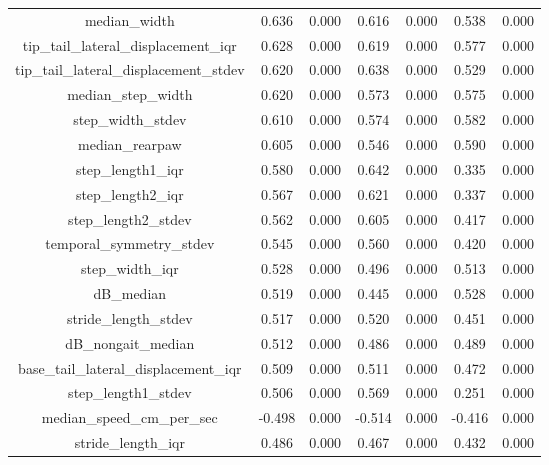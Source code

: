 \documentclass[11pt,reqno]{amsart}
\begin{document}
\begin{longtable}[c]{|c|c|c|c|c|c|c|}
median\_width                             & 0.636    & 0.000   & 0.616  & 0.000   & 0.538   & 0.000   \\
tip\_tail\_lateral\_displacement\_iqr     & 0.628    & 0.000   & 0.619  & 0.000   & 0.577   & 0.000   \\
tip\_tail\_lateral\_displacement\_stdev   & 0.620    & 0.000   & 0.638  & 0.000   & 0.529   & 0.000   \\
median\_step\_width                       & 0.620    & 0.000   & 0.573  & 0.000   & 0.575   & 0.000   \\
step\_width\_stdev                        & 0.610    & 0.000   & 0.574  & 0.000   & 0.582   & 0.000   \\
median\_rearpaw                           & 0.605    & 0.000   & 0.546  & 0.000   & 0.590   & 0.000   \\
step\_length1\_iqr                        & 0.580    & 0.000   & 0.642  & 0.000   & 0.335   & 0.000   \\
step\_length2\_iqr                        & 0.567    & 0.000   & 0.621  & 0.000   & 0.337   & 0.000   \\
step\_length2\_stdev                      & 0.562    & 0.000   & 0.605  & 0.000   & 0.417   & 0.000   \\
temporal\_symmetry\_stdev                 & 0.545    & 0.000   & 0.560  & 0.000   & 0.420   & 0.000   \\
step\_width\_iqr                          & 0.528    & 0.000   & 0.496  & 0.000   & 0.513   & 0.000   \\
dB\_median                                & 0.519    & 0.000   & 0.445  & 0.000   & 0.528   & 0.000   \\
stride\_length\_stdev                     & 0.517    & 0.000   & 0.520  & 0.000   & 0.451   & 0.000   \\
dB\_nongait\_median                       & 0.512    & 0.000   & 0.486  & 0.000   & 0.489   & 0.000   \\
base\_tail\_lateral\_displacement\_iqr    & 0.509    & 0.000   & 0.511  & 0.000   & 0.472   & 0.000   \\
step\_length1\_stdev                      & 0.506    & 0.000   & 0.569  & 0.000   & 0.251   & 0.000   \\
median\_speed\_cm\_per\_sec               & -0.498   & 0.000   & -0.514 & 0.000   & -0.416  & 0.000   \\
stride\_length\_iqr                       & 0.486    & 0.000   & 0.467  & 0.000   & 0.432   & 0.000   \\

\end{longtable}
\end{document}
